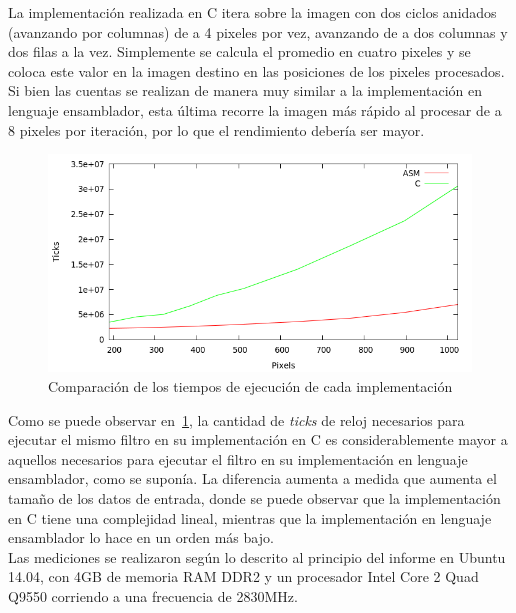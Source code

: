 \documentclass[a4paper]{article}
\begin{document}
La implementación realizada en C itera sobre la imagen con dos ciclos anidados (avanzando por columnas) de a 4 pixeles por vez, avanzando de a dos columnas y dos filas a la vez. Simplemente se calcula el promedio en cuatro pixeles y se coloca este valor en la imagen destino en las posiciones de los pixeles procesados. Si bien las cuentas se realizan de manera muy similar a la implementación en lenguaje ensamblador, esta última recorre la imagen más rápido al procesar de a 8 pixeles por iteración, por lo que el rendimiento debería ser mayor.
\\
\begin{figure}[H]
  \begin{center}
	\includegraphics[scale=0.77]{imagenes/pixelarC.png}
	\caption{Comparación de los tiempos de ejecución de cada implementación}
	\label{pixelar_asmvsc}
  \end{center}
\end{figure}

Como se puede observar en~\ref{pixelar_asmvsc}, la cantidad de \textit{ticks} de reloj necesarios para ejecutar el mismo filtro en su implementación en C es considerablemente mayor a aquellos necesarios para ejecutar el filtro en su implementación en lenguaje ensamblador, como se suponía. La diferencia aumenta a medida que aumenta el tamaño de los datos de entrada, donde se puede observar que la implementación en C tiene una complejidad lineal, mientras que la implementación en lenguaje ensamblador lo hace en un orden más bajo.
\\
Las mediciones se realizaron según lo descrito al principio del informe en Ubuntu 14.04, con 4GB de memoria RAM DDR2 y un procesador Intel Core 2 Quad Q9550 corriendo a una frecuencia de 2830MHz.
\end{document}
